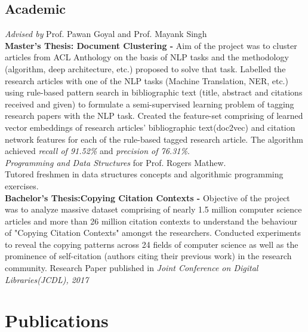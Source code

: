 \documentclass[11pt,a4paper,sans]{moderncv}        %
\begin{document}
\subsection{Academic}
{\textit{Advised by } Prof. Pawan Goyal and Prof. Mayank Singh\\
\textbf{Master's Thesis: Document Clustering -} Aim of the project was to cluster articles from ACL Anthology on the basis of NLP tasks and the methodology (algorithm, deep architecture, etc.) proposed to solve that task. 
Labelled the research articles with one of the NLP tasks (Machine Translation, NER, etc.) using rule-based pattern search in bibliographic text (title, abstract and citations received and given) to formulate a semi-supervised learning problem of tagging research papers with the NLP task. Created the feature-set comprising of learned vector embeddings of research articles’ bibliographic text(doc2vec) and citation network features for each of the rule-based tagged research article. The algorithm achieved \textit{recall of 91.52\%} and \textit{precision of 76.31\%}. \\}
\vspace{-2mm}
{\textit{Programming and Data Structures} for Prof. Rogers Mathew.\\
Tutored freshmen in data structures concepts and algorithmic programming exercises.\\}
\vspace{-2mm}
{\textbf{Bachelor's Thesis:Copying Citation Contexts -}  Objective of the project was to analyze massive dataset comprising of nearly 1.5 million computer science articles and more than 26 million citation contexts to understand the behaviour of "Copying Citation Contexts" amongst the researchers. Conducted experiments to reveal the copying patterns across 24 fields of computer science as well as the prominence of self-citation (authors citing their previous work) in the research community. Research Paper published in \textit{Joint Conference on Digital Libraries(JCDL), 2017}}
\vspace{-2mm}
\section{Publications}
\vspace{-2mm}
\end{document}
